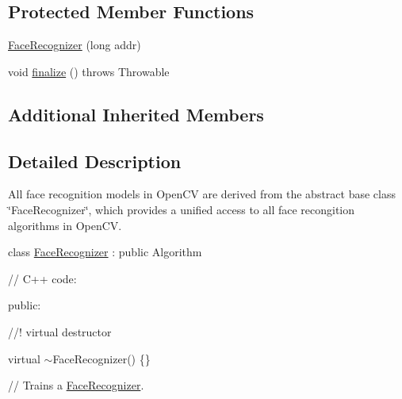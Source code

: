 \subsection*{Protected Member Functions}
\begin{DoxyCompactItemize}
\item 
\mbox{\hyperlink{classorg_1_1opencv_1_1contrib_1_1_face_recognizer_a697f676af90ddfdcbe27bae82fb201be}{Face\+Recognizer}} (long addr)
\item 
void \mbox{\hyperlink{classorg_1_1opencv_1_1contrib_1_1_face_recognizer_ae4529f57531f3d3f91dafa7f82e9418d}{finalize}} ()  throws Throwable 
\end{DoxyCompactItemize}
\subsection*{Additional Inherited Members}


\subsection{Detailed Description}
All face recognition models in Open\+CV are derived from the abstract base class \char`\"{}\+Face\+Recognizer\char`\"{}, which provides a unified access to all face recongition algorithms in Open\+CV.

class \mbox{\hyperlink{classorg_1_1opencv_1_1contrib_1_1_face_recognizer}{Face\+Recognizer}} \+: public Algorithm {\ttfamily }

{\ttfamily }

{\ttfamily }

{\ttfamily // C++ code\+:}

{\ttfamily }

{\ttfamily }

{\ttfamily public\+:}

{\ttfamily }

{\ttfamily }

{\ttfamily //! virtual destructor}

{\ttfamily }

{\ttfamily }

{\ttfamily virtual $\sim$\+Face\+Recognizer() \{\}}

{\ttfamily }

{\ttfamily }

{\ttfamily // Trains a \mbox{\hyperlink{classorg_1_1opencv_1_1contrib_1_1_face_recognizer}{Face\+Recognizer}}.}

{\ttfamily }

{\ttfamily }

